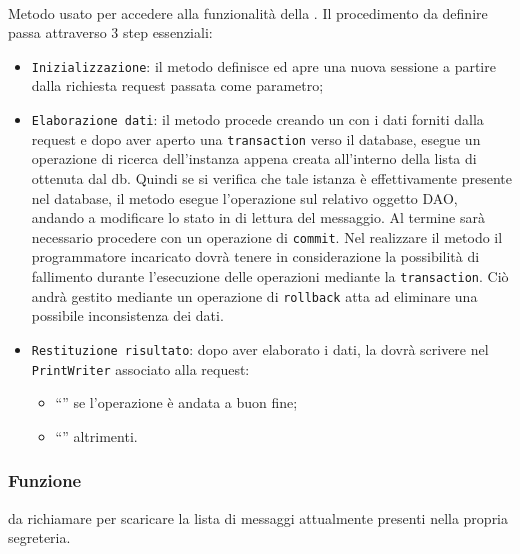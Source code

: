\begin{description}
	\item{}\\
	Metodo usato per accedere alla funzionalità della . Il procedimento da definire passa attraverso 3 step essenziali:
	\begin{itemize}
		\item \texttt{Inizializzazione}: il metodo definisce ed apre una nuova sessione a partire dalla richiesta request passata come parametro;
		\item \texttt{Elaborazione dati}: il metodo procede creando un  con i dati forniti dalla request e dopo aver aperto una \texttt{transaction} verso il database, esegue un operazione di ricerca dell'instanza appena creata all'interno della lista di  ottenuta dal db. Quindi se si verifica che tale istanza è effettivamente presente nel database, il metodo esegue l'operazione  sul relativo oggetto DAO, andando a modificare lo stato in di lettura del messaggio. Al termine sarà necessario procedere con un operazione di \texttt{commit}. Nel realizzare il metodo il programmatore incaricato dovrà tenere in considerazione la possibilità di fallimento durante l'esecuzione delle operazioni mediante la \texttt{transaction}. Ciò andrà gestito mediante un operazione di \texttt{rollback} atta ad eliminare una possibile inconsistenza dei dati.
		\item \texttt{Restituzione risultato}: dopo aver elaborato i dati, la  dovrà scrivere nel \texttt{PrintWriter} associato alla request:
			\begin{itemize}
				\item ``'' se l'operazione è andata a buon fine;
				\item ``'' altrimenti.
			\end{itemize}
	\end{itemize}

\end{description}


\subsubsection*{Funzione}
 da richiamare per scaricare la lista di messaggi attualmente presenti nella propria segreteria.

